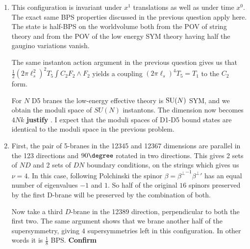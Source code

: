 \documentclass[11pt, class=article, crop=false]{standalone}
\begin{document}
\begin{enumerate}
	To confirm that these instantons really \emph{are} D$_{-1}$ branes, note that the CS term contains $\frac12 (2\pi \ell_s^2)^2 T_3 \int C_0 F_2 \wedge F_2$. For a nontrivial instanton configuration we get $\int F_2 \wedge F_2 = 8 \pi^2$. Thus the instanton coupling to $C_0$ is $(2 \pi \ell_s)^4 T_3 = T_{-1}$, exactly the charge of the D$_{-1}$ brane. \textbf{Does this exclude the possibility of objects with the same charge and BPS properties as $D_{-1}$ branes, but that don't have interpretations as endpoints of open strings?}
	
	 I expect the moduli space to have dimension $4 n$, corresponding to the space (technically Hilbert scheme) of $n$ points on $\mathbb R^4$.
	
	\item This configuration is invariant under $x^1$ translations as well as under time $x^0$. The exact same BPS properties discussed in the previous question apply here. The state is half-BPS on the worldvolume both from the POV of string theory and from the POV of the low energy SYM theory having half the gaugino variations vanish. 
	
	The same instanton action argument in the previous question gives us that $\frac12 (2\pi \ell_s^2)^2 T_5 \int C_2 F_2 \wedge F_2$ yields a coupling $(2\pi \ell_s)^4 T_5 = T_1$ to the $C_2$ form.  
	
	For $N$ D5 branes the low-energy effective theory is $\mathrm{SU}(N)$ SYM, and we obtain the moduli space of $SU(N)$ instantons. The dimension now becomes $4 N k$ \textbf{justify} . I expect that the moduli spaces of D1-D5 bound states are identical to the moduli space in the previous problem. 
	
	\item First, the pair of 5-branes in the 12345 and 12367 dimensions are parallel in the 123 directions and $90\degree$ rotated in two directions. This gives 2 sets of $ND$ and 2 sets of $DN$ boundary conditions, on the strings which gives us $\nu = 4$. In this case, following Polchinski the spinor $\beta = {\beta^{\perp}}^{-1} {\beta^\perp}'$ has an equal number of eigenvalues $-1$ and $1$. So half of the original $16$ spinors preserved by the first D-brane will be preserved by the combination of both. 
	
	Now take a third $D$-brane in the 12389 direction, perpendicular to both the first two. The same argument shows that we brane another half of the supersymmetry, giving $4$ supersymmetries left in this configuration. In other words it is $\frac18$ BPS. \textbf{Confirm}
	

\end{enumerate}
\end{document}
